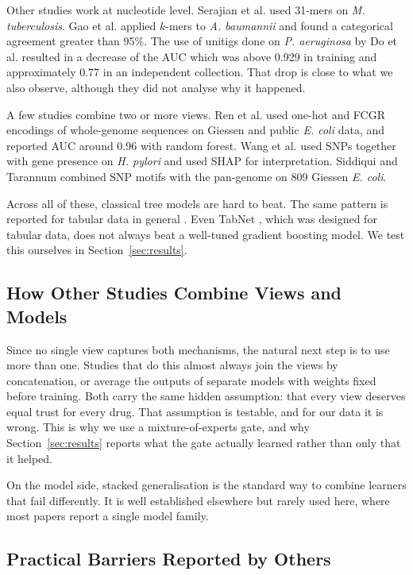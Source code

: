 \documentclass[conference]{IEEEtran}
\begin{document}
Other studies work at nucleotide level. Serajian et al. \cite{serajian2024} used
31-mers on \textit{M. tuberculosis}. Gao et al. \cite{gao2024} applied $k$-mers to \textit{A. baumannii} and found a
categorical agreement greater than 95\%. The use of unitigs done on \textit{P.
aeruginosa} by Do et al. \cite{do2024} resulted in a decrease of the AUC which was
above 0.929 in training and approximately 0.77 in an independent collection. That drop is
close to what we also observe, although they did not analyse why it happened.

A few studies combine two or more views. Ren et al. \cite{ren2022} used one-hot
and FCGR encodings of whole-genome sequences on Giessen and public \textit{E. coli}
data, and reported AUC around 0.96 with random forest. Wang et al.
\cite{wang2025} used SNPs together with gene presence on \textit{H. pylori} and
used SHAP for interpretation. Siddiqui and Tarannum \cite{siddiqui2025} combined
SNP motifs with the pan-genome on 809 Giessen \textit{E. coli}.

Across all of these, classical tree models are hard to beat. The same pattern is
reported for tabular data in general \cite{grinsztajn2022,shwartzziv2022}. Even
TabNet \cite{arik2021}, which was designed for tabular data, does not always beat
a well-tuned gradient boosting model. We test this ourselves in
Section~\ref{sec:results}.

\subsection{How Other Studies Combine Views and Models}

Since no single view captures both mechanisms, the natural next step is to use more
than one. Studies that do this almost always join the views by concatenation, or
average the outputs of separate models with weights fixed before training. Both
carry the same hidden assumption: that every view deserves equal trust for every
drug. That assumption is testable, and for our data it is wrong. This is why we use
a mixture-of-experts gate, and why Section~\ref{sec:results} reports what the gate
actually learned rather than only that it helped.

On the model side, stacked generalisation \cite{wolpert1992} is the standard way to
combine learners that fail differently. It is well established elsewhere but rarely
used here, where most papers report a single model family.

\subsection{Practical Barriers Reported by Others}
\end{document}
